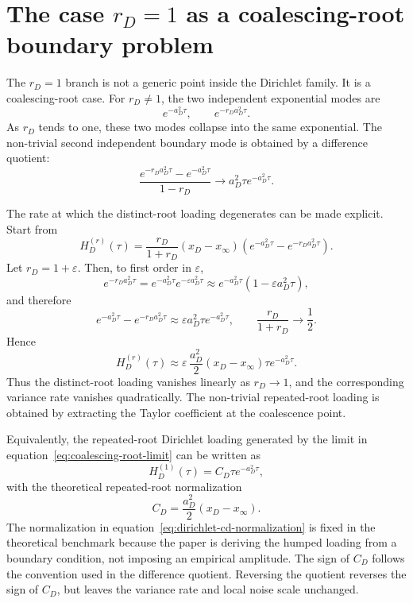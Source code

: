 \documentclass[11pt]{article}
\numberwithin{equation}{section}
\begin{document}
\section{The case \texorpdfstring{$r_D=1$}{rD=1} as a coalescing-root boundary problem}

The $r_D=1$ branch is not a generic point inside the Dirichlet family. It is a coalescing-root case. For $r_D\neq1$, the two independent exponential modes are
\begin{equation}
e^{-a_D^2\tau},
\qquad
 e^{-r_Da_D^2\tau}.
\end{equation}
As $r_D$ tends to one, these two modes collapse into the same exponential. The non-trivial second independent boundary mode is obtained by a difference quotient:
\begin{equation}
\label{eq:coalescing-root-limit}
\frac{e^{-r_Da_D^2\tau}-e^{-a_D^2\tau}}{1-r_D}
\longrightarrow
 a_D^2\tau e^{-a_D^2\tau}.
\end{equation}

The rate at which the distinct-root loading degenerates can be made explicit. Start from
\begin{equation}
H_D^{(r)}(\tau)
=
\frac{r_D}{1+r_D}(x_D-x_\infty)
\left(e^{-a_D^2\tau}-e^{-r_Da_D^2\tau}\right).
\end{equation}
Let $r_D=1+\varepsilon$. Then, to first order in $\varepsilon$,
\begin{equation}
e^{-r_Da_D^2\tau}
=
e^{-a_D^2\tau}e^{-\varepsilon a_D^2\tau}
\approx
e^{-a_D^2\tau}\left(1-\varepsilon a_D^2\tau\right),
\end{equation}
and therefore
\begin{equation}
e^{-a_D^2\tau}-e^{-r_Da_D^2\tau}
\approx
\varepsilon a_D^2\tau e^{-a_D^2\tau},
\qquad
\frac{r_D}{1+r_D}\to \frac12.
\end{equation}
Hence
\begin{equation}
H_D^{(r)}(\tau)
\approx
\varepsilon\,\frac{a_D^2}{2}(x_D-x_\infty)\tau e^{-a_D^2\tau}.
\end{equation}
Thus the distinct-root loading vanishes linearly as $r_D\to1$, and the corresponding variance rate vanishes quadratically. The non-trivial repeated-root loading is obtained by extracting the Taylor coefficient at the coalescence point.

Equivalently, the repeated-root Dirichlet loading generated by the limit in equation~\eqref{eq:coalescing-root-limit} can be written as
\begin{equation}
\label{eq:dirichlet-repeated-root-loading}
H_D^{(1)}(\tau)=C_D\tau e^{-a_D^2\tau},
\end{equation}
with the theoretical repeated-root normalization
\begin{equation}
\label{eq:dirichlet-cd-normalization}
C_D=\frac{a_D^2}{2}(x_D-x_\infty).
\end{equation}
The normalization in equation~\eqref{eq:dirichlet-cd-normalization} is fixed in the theoretical benchmark because the paper is deriving the humped loading from a boundary condition, not imposing an empirical amplitude. The sign of $C_D$ follows the convention used in the difference quotient. Reversing the quotient reverses the sign of $C_D$, but leaves the variance rate and local noise scale unchanged.
\end{document}
